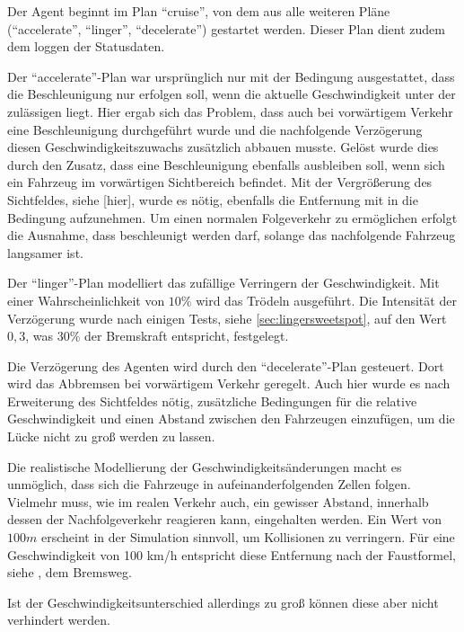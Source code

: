 Der Agent beginnt im Plan \enquote{cruise}, von dem aus alle weiteren Pläne (\enquote{accelerate}, \enquote{linger}, \enquote{decelerate}) gestartet werden.
Dieser Plan dient zudem dem loggen der Statusdaten.

Der \enquote{accelerate}-Plan war ursprünglich nur mit der Bedingung ausgestattet, dass die Beschleunigung nur erfolgen soll, wenn die aktuelle Geschwindigkeit unter der zulässigen liegt.
Hier ergab sich das Problem, dass auch bei vorwärtigem Verkehr eine Beschleunigung durchgeführt wurde und die nachfolgende Verzögerung diesen Geschwindigkeitszuwachs zusätzlich abbauen musste.
Gelöst wurde dies durch den Zusatz, dass eine Beschleunigung ebenfalls ausbleiben soll, wenn sich ein Fahrzeug im vorwärtigen Sichtbereich befindet.
Mit der Vergrößerung des Sichtfeldes, siehe [hier], wurde es nötig, ebenfalls die Entfernung mit in die Bedingung aufzunehmen.
Um einen normalen Folgeverkehr zu ermöglichen erfolgt die Ausnahme, dass beschleunigt werden darf, solange das nachfolgende Fahrzeug langsamer ist.

Der \enquote{linger}-Plan modelliert das zufällige Verringern der Geschwindigkeit. 
Mit einer Wahrscheinlichkeit von $10 \%$ wird das Trödeln ausgeführt.
Die Intensität der Verzögerung wurde nach einigen Tests, siehe \cref{sec:lingersweetspot}, auf den Wert $0,3$, was $30 \%$ der Bremskraft entspricht, festgelegt.

Die Verzögerung des Agenten wird durch den \enquote{decelerate}-Plan gesteuert. 
Dort wird das Abbremsen bei vorwärtigem Verkehr geregelt. Auch hier wurde es nach Erweiterung des Sichtfeldes nötig, zusätzliche Bedingungen für die relative Geschwindigkeit und einen Abstand zwischen den Fahrzeugen einzufügen, um die Lücke nicht zu groß werden zu lassen.

Die realistische Modellierung der Geschwindigkeitsänderungen macht es unmöglich, dass sich die Fahrzeuge in aufeinanderfolgenden Zellen folgen.
Vielmehr muss, wie im realen Verkehr auch, ein gewisser Abstand, innerhalb dessen der Nachfolgeverkehr reagieren kann, eingehalten werden.
Ein Wert von $100 m$ erscheint in der Simulation sinnvoll, um Kollisionen zu verringern. 
Für eine Geschwindigkeit von 100 km/h entspricht diese Entfernung nach der Faustformel, siehe \cite{bremsweg}, dem Bremsweg.

Ist der Geschwindigkeitsunterschied allerdings zu groß können diese aber nicht verhindert werden.




